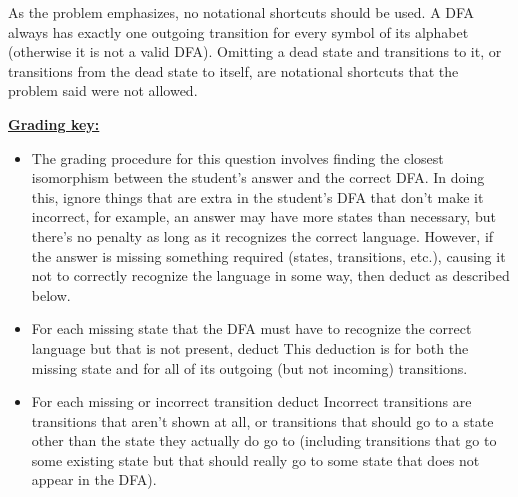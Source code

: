 \documentclass[11pt,fleqn]{article}
\begin{document}
\begin{enumerate}
          \enlargethispage{3mm}

          \bigskip

          As the problem emphasizes, no notational shortcuts should be used.
          A DFA always has exactly one outgoing transition for every symbol
          of its alphabet (otherwise it is not a valid DFA).  Omitting a
          dead state and transitions to it, or transitions from the dead
          state to itself, are notational shortcuts that the problem said
          were not allowed.

          \begin{info}{\textbf{\underline{Grading key:}}}

            \smallskip

            \begin{itemize}

              \addtolength{\itemsep}{2mm}

              \item The grading procedure for this question involves finding
                    the closest isomorphism between the student's answer and
                    the correct DFA.  In doing this, ignore things that are
                    extra in the student's DFA that don't make it
                    incorrect, for example, an answer may have more states
                    than necessary, but there's no penalty as long as it
                    recognizes the correct language.  However, if the answer
                    is missing something required (states, transitions,
                    etc.), causing it not to correctly recognize the
                    language in some way, then deduct as described below.

              \item For each missing state that the DFA must have to
                    recognize the correct language but that is not present,
                    deduct   This deduction is for both the missing
                    state and for all of its outgoing (but not incoming)
                    transitions.

              \item For each missing or incorrect transition deduct 
                    Incorrect transitions are transitions that aren't shown
                    at all, or transitions that should go to a state other
                    than the state they actually do go to (including
                    transitions that go to some existing state but that
                    should really go to some state that does not appear in
                    the DFA).


\end{itemize}
\end{info}
\end{enumerate}
\end{document}

